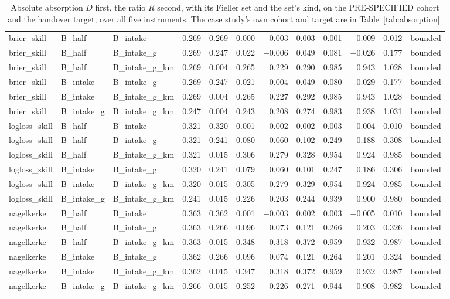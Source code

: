 \begin{table}[t]
{\begin{tabular}{lllrrrrrrrrl}
brier\_skill & B\_half & B\_intake & 0.269 & 0.269 & 0.000 & $-$0.003 & 0.003 & 0.001 & $-$0.009 & 0.012 & bounded \\
brier\_skill & B\_half & B\_intake\_g & 0.269 & 0.247 & 0.022 & $-$0.006 & 0.049 & 0.081 & $-$0.026 & 0.177 & bounded \\
brier\_skill & B\_half & B\_intake\_g\_km & 0.269 & 0.004 & 0.265 & 0.229 & 0.290 & 0.985 & 0.943 & 1.028 & bounded \\
brier\_skill & B\_intake & B\_intake\_g & 0.269 & 0.247 & 0.021 & $-$0.004 & 0.049 & 0.080 & $-$0.029 & 0.177 & bounded \\
brier\_skill & B\_intake & B\_intake\_g\_km & 0.269 & 0.004 & 0.265 & 0.227 & 0.292 & 0.985 & 0.943 & 1.028 & bounded \\
brier\_skill & B\_intake\_g & B\_intake\_g\_km & 0.247 & 0.004 & 0.243 & 0.208 & 0.274 & 0.983 & 0.938 & 1.031 & bounded \\
logloss\_skill & B\_half & B\_intake & 0.321 & 0.320 & 0.001 & $-$0.002 & 0.002 & 0.003 & $-$0.004 & 0.010 & bounded \\
logloss\_skill & B\_half & B\_intake\_g & 0.321 & 0.241 & 0.080 & 0.060 & 0.102 & 0.249 & 0.188 & 0.308 & bounded \\
logloss\_skill & B\_half & B\_intake\_g\_km & 0.321 & 0.015 & 0.306 & 0.279 & 0.328 & 0.954 & 0.924 & 0.985 & bounded \\
logloss\_skill & B\_intake & B\_intake\_g & 0.320 & 0.241 & 0.079 & 0.060 & 0.101 & 0.247 & 0.186 & 0.306 & bounded \\
logloss\_skill & B\_intake & B\_intake\_g\_km & 0.320 & 0.015 & 0.305 & 0.279 & 0.329 & 0.954 & 0.924 & 0.985 & bounded \\
logloss\_skill & B\_intake\_g & B\_intake\_g\_km & 0.241 & 0.015 & 0.226 & 0.203 & 0.244 & 0.939 & 0.900 & 0.980 & bounded \\
nagelkerke & B\_half & B\_intake & 0.363 & 0.362 & 0.001 & $-$0.003 & 0.002 & 0.003 & $-$0.005 & 0.010 & bounded \\
nagelkerke & B\_half & B\_intake\_g & 0.363 & 0.266 & 0.096 & 0.073 & 0.121 & 0.266 & 0.203 & 0.326 & bounded \\
nagelkerke & B\_half & B\_intake\_g\_km & 0.363 & 0.015 & 0.348 & 0.318 & 0.372 & 0.959 & 0.932 & 0.987 & bounded \\
nagelkerke & B\_intake & B\_intake\_g & 0.362 & 0.266 & 0.096 & 0.074 & 0.121 & 0.264 & 0.201 & 0.324 & bounded \\
nagelkerke & B\_intake & B\_intake\_g\_km & 0.362 & 0.015 & 0.347 & 0.318 & 0.372 & 0.959 & 0.932 & 0.987 & bounded \\
nagelkerke & B\_intake\_g & B\_intake\_g\_km & 0.266 & 0.015 & 0.252 & 0.226 & 0.271 & 0.944 & 0.908 & 0.982 & bounded \\
\bottomrule
\end{tabular}%
}
\caption{Absolute absorption $D$ first, the ratio $R$ second, with its Fieller set and the set's kind, on the PRE-SPECIFIED cohort and the handover target, over all five instruments. The case study's own cohort and target are in Table~\ref{tab:absorption}.}
\label{tab:absorptioncorpus}
\end{table}
